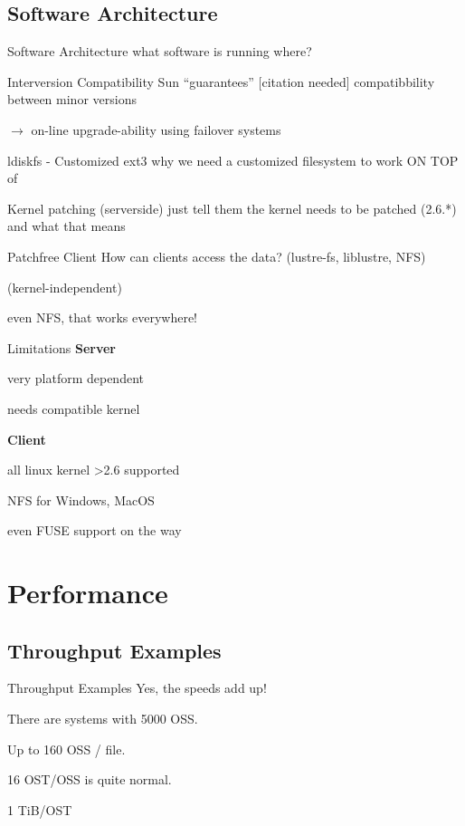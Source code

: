 \documentclass[compress,t]{beamer}
\newcommand{\sectiontoc}{
    \begin{frame}{\textbf{\insertsectionhead}}
        \tableofcontents[current]
    \end{frame}

    \addtocounter{framenumber}{-1}%
}
\begin{document}
\subsection{Software Architecture}
\begin{frame}{Software Architecture}
    what software is running where?
\end{frame}
\begin{frame}{Interversion Compatibility}
    Sun ``guarantees'' [citation needed] compatibbility between
    minor versions

    $\rightarrow$ on-line upgrade-ability using failover systems
\end{frame}
\begin{frame}{ldiskfs - Customized ext3}
    why we need a customized filesystem to work ON TOP of
\end{frame}
\begin{frame}{Kernel patching (serverside)}
    just tell them the kernel needs to be patched (2.6.*) and what that means
\end{frame}
\begin{frame}{Patchfree Client}
    How can clients access the data? (lustre-fs, liblustre, NFS)

    (kernel-independent)

    even NFS, that works everywhere!
\end{frame}
\begin{frame}{Limitations}
    \textbf{Server}

    very platform dependent

    needs compatible kernel

    \textbf{Client}

    all linux kernel \textgreater2.6 supported

    NFS for Windows, MacOS

    even FUSE support on the way
\end{frame}


\section{Performance}
\sectiontoc

\subsection{Throughput Examples}
\begin{frame}{Throughput Examples}
    Yes, the speeds add up!

    There are systems with 5000 OSS.

    Up to 160 OSS / file.

    16 OST/OSS is quite normal.

    1 TiB/OST
\end{frame}
\end{document}
